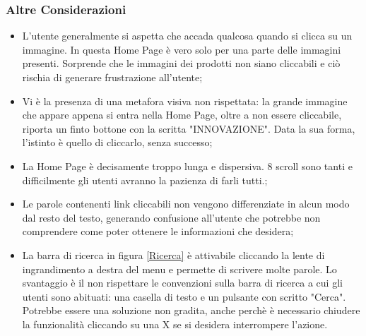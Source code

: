 \subsubsection{Altre Considerazioni}
\begin{itemize}
	\item L'utente generalmente si aspetta che accada qualcosa quando si clicca su un immagine. In questa Home Page è vero solo per una parte delle immagini presenti. Sorprende che le immagini dei prodotti non siano cliccabili e ciò rischia di generare frustrazione all'utente; 
	\item Vi è la presenza di una metafora visiva non rispettata: la grande immagine che appare appena si entra nella Home Page, oltre a non essere cliccabile, riporta un finto bottone con la scritta "INNOVAZIONE". Data la sua forma, l'istinto è quello di cliccarlo, senza successo;
	\item La Home Page è decisamente troppo lunga e dispersiva. 8 scroll sono tanti e difficilmente gli utenti avranno la pazienza di farli tutti.;
	\item Le parole contenenti link cliccabili non vengono differenziate in alcun modo dal resto del testo, generando confusione all'utente che potrebbe non comprendere come poter ottenere le informazioni che desidera;
	\item La barra di ricerca in figura \ref{Ricerca} è attivabile cliccando la lente di ingrandimento a destra del menu e permette di scrivere molte parole. Lo svantaggio è il non rispettare le convenzioni sulla barra di ricerca a cui gli utenti sono abituati: una casella di testo e un pulsante con scritto "Cerca". Potrebbe essere una soluzione non gradita, anche perchè è necessario chiudere la funzionalità cliccando su una X se si desidera interrompere l'azione.
\end{itemize}

